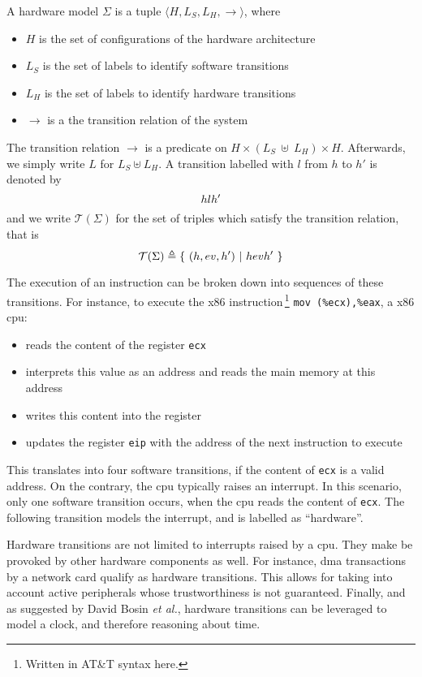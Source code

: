 \begin{definition}
  A hardware model $\Sigma$ is a tuple
  $\langle H, L_S, L_H, \rightarrow \rangle$, where
  \begin{itemize}
  \item $H$ is the set of configurations of the hardware architecture
  \item $L_S$ is the set of labels to identify software transitions
  \item $L_H$ is the set of labels to identify hardware transitions
  \item $\rightarrow$ is a the transition relation of the system
  \end{itemize}

  The transition relation $\rightarrow$ is a predicate on
  $H \times (L_S~\uplus~L_H) \times H$.
  Afterwards, we simply write $L$ for $L_S \uplus L_H$.
  A transition labelled with $l$ from $h$ to $h'$ is denoted by
  \[
    \transitionLTS{Ez}{h}{l}{h'}
  \]
  and we write $\mathcal{T}(\Sigma)$ for the set of triples which satisfy the
  transition relation, that is
  \[
    \mathcal{T}(\Sigma) \triangleq \{\ (h, ev, h')\ |\
    \transitionLTS{Ez}{h}{ev}{h'}\ \}
  \]
\end{definition}

The execution of an instruction can be broken down into sequences of these
transitions.
%
For instance, to execute the x86 instruction\,\footnote{Written in AT\&T syntax
  here.} \texttt{mov (\%ecx),\%eax}, a x86 \ac{cpu}:
%
\begin{itemize}
\item reads the content of the register \texttt{ecx}
%
\item interprets this value as an address and reads the main memory at this
  address
%
\item writes this content into the register 
%
\item updates the register \texttt{eip} with the address of the next instruction
  to execute
\end{itemize}

This translates into four software transitions, if the content of \texttt{ecx}
is a valid address.
%
On the contrary, the \ac{cpu} typically raises an interrupt.
%
In this scenario, only one software transition occurs, when the \ac{cpu} reads
the content of \texttt{ecx}.
%
The following transition models the interrupt, and is labelled as ``hardware''.

Hardware transitions are not limited to interrupts raised by a \ac{cpu}.
%
They make be provoked by other hardware components as well.
%
For instance, \ac{dma} transactions by a network card qualify as hardware
transitions.
%
This allows for taking into account active peripherals whose trustworthiness is
not guaranteed.
%
Finally, and as suggested by David Bosin \emph{et al.}, hardware transitions can
be leveraged to model a clock, and therefore reasoning about time.

